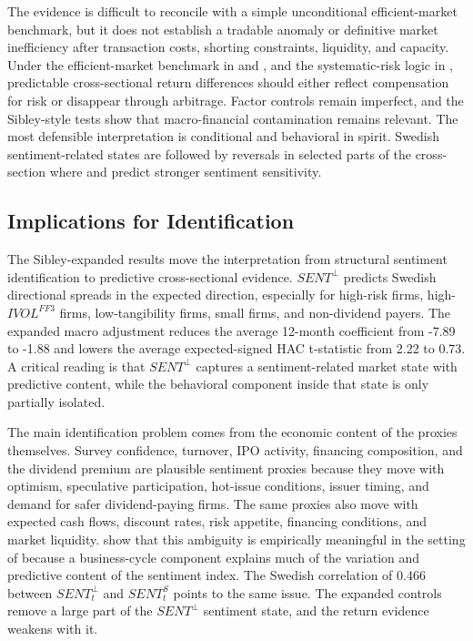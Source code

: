 \documentclass[11pt]{article}
\newcommand{\var}[1]{\ensuremath{#1}}
\begin{document}
The evidence is difficult to reconcile with a simple unconditional efficient-market benchmark, but it does not establish a tradable anomaly or definitive market inefficiency after transaction costs, shorting constraints, liquidity, and capacity. Under the efficient-market benchmark in \citet{fama1970efficient} and \citet{fama1991efficient}, and the systematic-risk logic in \citet{sharpe1964capital}, predictable cross-sectional return differences should either reflect compensation for risk or disappear through arbitrage. Factor controls remain imperfect, and the Sibley-style tests show that macro-financial contamination remains relevant. The most defensible interpretation is conditional and behavioral in spirit. Swedish sentiment-related states are followed by reversals in selected parts of the cross-section where \citet{baker2006sentiment} and \citet{stambaugh2012short} predict stronger sentiment sensitivity.

\subsection{Implications for Identification}
The Sibley-expanded results move the interpretation from structural sentiment identification to predictive cross-sectional evidence. \var{SENT^{\perp}} predicts Swedish directional spreads in the expected direction, especially for high-risk firms, high-\var{IVOL^{FF3}} firms, low-tangibility firms, small firms, and non-dividend payers. The expanded macro adjustment reduces the average 12-month coefficient from -7.89 to -1.88 and lowers the average expected-signed HAC t-statistic from 2.22 to 0.73. A critical reading is that \var{SENT^{\perp}} captures a sentiment-related market state with predictive content, while the behavioral component inside that state is only partially isolated.

The main identification problem comes from the economic content of the proxies themselves. Survey confidence, turnover, IPO activity, financing composition, and the dividend premium are plausible sentiment proxies because they move with optimism, speculative participation, hot-issue conditions, issuer timing, and demand for safer dividend-paying firms. The same proxies also move with expected cash flows, discount rates, risk appetite, financing conditions, and market liquidity. \citet{sibley2012sentimental} show that this ambiguity is empirically meaningful in the setting of \citet{baker2006sentiment} because a business-cycle component explains much of the variation and predictive content of the sentiment index. The Swedish correlation of 0.466 between \var{SENT^{\perp}_{t}} and \var{SENT^{S}_{t}} points to the same issue. The expanded controls remove a large part of the \var{SENT^{\perp}} sentiment state, and the return evidence weakens with it.
\end{document}
